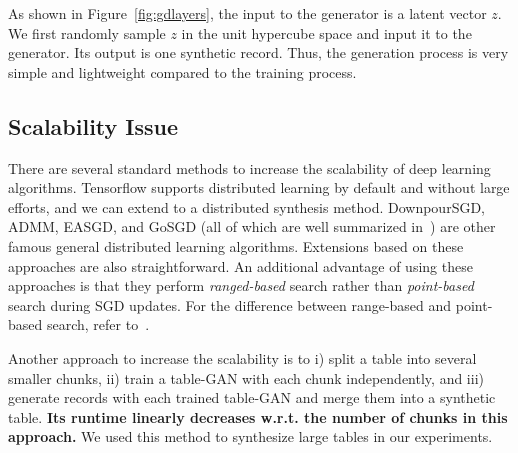 As shown in Figure~\ref{fig:gdlayers}, the input to the generator is a latent vector $z$. We first randomly sample $z$ in the unit hypercube space and input it to the generator. Its output is one synthetic record. Thus, the generation process is very simple and lightweight compared to the training process.

\subsection{Scalability Issue}\label{scal}
There are several standard methods to increase the scalability of deep learning algorithms. Tensorflow supports distributed learning by default and without large efforts, and we can extend to a distributed synthesis method. DownpourSGD, ADMM, EASGD, and GoSGD (all of which are well summarized in~\cite{DBLP:journals/corr/Zhang16b}) are other famous general distributed learning algorithms. Extensions based on these approaches are also straightforward. An additional advantage of using these approaches is that they perform \textit{ranged-based} search rather than \textit{point-based} search during SGD updates. For the difference between range-based and point-based search, refer to~\cite{Boyd:2011:DOS:2185815.2185816}.

Another approach to increase the scalability is to i) split a table into several smaller chunks, ii) train a table-GAN with each chunk independently, and iii) generate records with each trained table-GAN and merge them into a synthetic table. \textbf{Its runtime linearly decreases w.r.t. the number of chunks in this approach.} We used this method to synthesize large tables in our experiments.